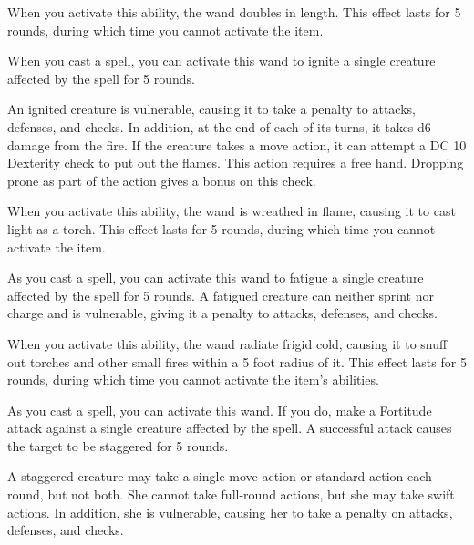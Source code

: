 When you activate this ability, the wand doubles in length.
This effect lasts for 5 rounds, during which time you cannot activate the item.


 When you cast a spell, you can activate this wand to ignite a single creature affected by the spell for 5 rounds.

An ignited creature is vulnerable, causing it to take a  penalty to attacks, defenses, and checks.
In addition, at the end of each of its turns, it takes d6 damage from the fire.
If the creature takes a move action, it can attempt a DC 10 Dexterity check to put out the flames.
This action requires a free hand.
Dropping prone as part of the action gives a  bonus on this check.

When you activate this ability, the wand is wreathed in flame, causing it to cast light as a torch.
This effect lasts for 5 rounds, during which time you cannot activate the item.


 As you cast a spell, you can activate this wand to fatigue a single creature affected by the spell for 5 rounds.
A fatigued creature can neither sprint nor charge and is vulnerable, giving it a  penalty to attacks, defenses, and checks.

When you activate this ability, the wand radiate frigid cold, causing it to snuff out torches and other small fires within a 5 foot radius of it.
This effect lasts for 5 rounds, during which time you cannot activate the item's abilities.


 As you cast a spell, you can activate this wand.
If you do, make a Fortitude attack against a single creature affected by the spell.
A successful attack causes the target to be staggered for 5 rounds.

A staggered creature may take a single move action or standard action each round, but not both.
She cannot take full-round actions, but she may take swift actions.
In addition, she is vulnerable, causing her to take a  penalty on attacks, defenses, and checks.

